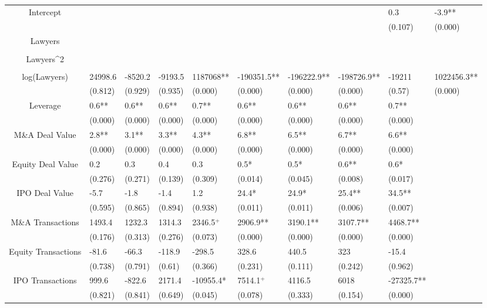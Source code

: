 \documentclass{article}
\begin{document}
\begin{table}[H]
\begin{tabular}{|clllllllll|}
Intercept &  &  &  &  &  &  &  & 0.3 & -3.9** \\ 
   &  &  &  &  &  &  &  & (0.107) & (0.000) \\ 
  Lawyers &  &  &  &  &  &  &  &  &  \\ 
   &  &  &  &  &  &  &  &  &  \\ 
  Lawyers^2 &  &  &  &  &  &  &  &  &  \\ 
   &  &  &  &  &  &  &  &  &  \\ 
  log(Lawyers) & 24998.6 & -8520.2 & -9193.5 & 1187068** & -190351.5** & -196222.9** & -198726.9** & -19211 & 1022456.3** \\ 
   & (0.812) & (0.929) & (0.935) & (0.000) & (0.000) & (0.000) & (0.000) & (0.57) & (0.000) \\ 
  Leverage & 0.6** & 0.6** & 0.6** & 0.7** & 0.6** & 0.6** & 0.6** & 0.7** &  \\ 
   & (0.000) & (0.000) & (0.000) & (0.000) & (0.000) & (0.000) & (0.000) & (0.000) &  \\ 
  M\&A Deal Value & 2.8** & 3.1** & 3.3** & 4.3** & 6.8** & 6.5** & 6.7** & 6.6** &  \\ 
   & (0.000) & (0.000) & (0.000) & (0.000) & (0.000) & (0.000) & (0.000) & (0.000) &  \\ 
  Equity Deal Value & 0.2 & 0.3 & 0.4 & 0.3 & 0.5* & 0.5* & 0.6** & 0.6* &  \\ 
   & (0.276) & (0.271) & (0.139) & (0.309) & (0.014) & (0.045) & (0.008) & (0.017) &  \\ 
  IPO Deal Value & -5.7 & -1.8 & -1.4 & 1.2 & 24.4* & 24.9* & 25.4** & 34.5** &  \\ 
   & (0.595) & (0.865) & (0.894) & (0.938) & (0.011) & (0.011) & (0.006) & (0.007) &  \\ 
  M\&A Transactions & 1493.4 & 1232.3 & 1314.3 & 2346.5$^{+}$ & 2906.9** & 3190.1** & 3107.7** & 4468.7** &  \\ 
   & (0.176) & (0.313) & (0.276) & (0.073) & (0.000) & (0.000) & (0.000) & (0.000) &  \\ 
  Equity Transactions & -81.6 & -66.3 & -118.9 & -298.5 & 328.6 & 440.5 & 323 & -15.4 &  \\ 
   & (0.738) & (0.791) & (0.61) & (0.366) & (0.231) & (0.111) & (0.242) & (0.962) &  \\ 
  IPO Transactions & 999.6 & -822.6 & 2171.4 & -10955.4* & 7514.1$^{+}$ & 4116.5 & 6018 & -27325.7** &  \\ 
   & (0.821) & (0.841) & (0.649) & (0.045) & (0.078) & (0.333) & (0.154) & (0.000) &  \\ 

\end{tabular}
\end{table}
\end{document}
